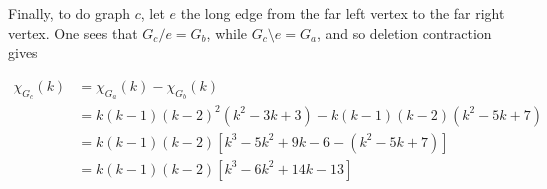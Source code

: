 \documentclass{amsart}
\begin{document}
Finally, to do graph $c$, let $e$ the long edge from the far left vertex to the far right vertex.  One sees that $G_c/e=G_b$, while $G_c\setminus e=G_a$, and so deletion contraction gives

\begin{align*}
  \chi_{G_c}(k) &=\chi_{G_a}(k)-\chi_{G_b}(k) \\
  &=k(k-1)(k-2)^2(k^2-3k+3) -k(k-1)(k-2)(k^2-5k+7) \\
  &=k(k-1)(k-2)[k^3-5k^2+9k-6-(k^2-5k+7)] \\
  &=k(k-1)(k-2)[k^3-6k^2+14k-13]
\end{align*}
\end{document}
